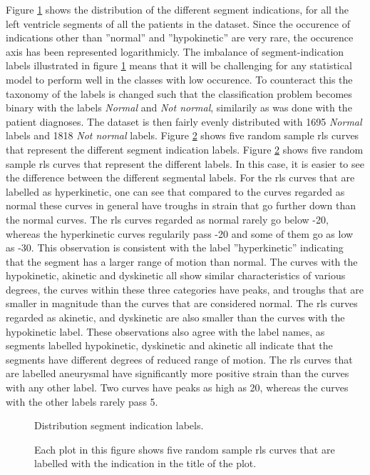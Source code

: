 Figure \ref{fig:segm_label_dist} shows the distribution of the different segment indications, for all the left ventricle segments of all the patients in the dataset. Since the occurence of indications other than ''normal'' and ''hypokinetic'' are very rare, the occurence axis has been represented logarithmicly. The imbalance of segment-indication labels illustrated in figure \ref{fig:segm_label_dist} means that it will be challenging for any statistical model to perform well in the classes with low occurence. To counteract this the taxonomy of the labels is changed such that the classification problem becomes binary with the labels \textit{Normal} and \textit{Not normal}, similarily as was done with the patient diagnoses. The dataset is then fairly evenly distributed with 1695 \textit{Normal} labels and 1818 \textit{Not normal} labels. Figure \ref{fig:rls_curves_vs_segm_labels} shows five random sample \acrshort{rls} curves that represent the different segment indication labels. Figure \ref{fig:rls_curves_vs_segm_labels} shows five random sample \acrshort{rls} curves that represent the different labels. In this case, it is easier to see the difference between the different segmental labels. For the \acrshort{rls} curves that are labelled as hyperkinetic, one can see that compared to the curves regarded as normal these curves in general have troughs in strain that go further down than the normal curves. The \acrshort{rls} curves regarded as normal rarely go below -20, whereas the hyperkinetic curves regularily pass -20 and some of them go as low as -30. This observation is consistent with the label ''hyperkinetic'' indicating that the segment has a larger range of motion than normal.  The curves with the hypokinetic, akinetic and dyskinetic all show similar characteristics of various degrees, the curves within these three categories have peaks, and troughs that are smaller in magnitude than the curves that are considered normal. The \acrshort{rls} curves regarded as akinetic, and dyskinetic are also smaller than the curves with the hypokinetic label. These observations also agree with the label names, as segments labelled hypokinetic, dyskinetic and akinetic all indicate that the segments have different degrees of reduced range of motion. The \acrshort{rls} curves that are labelled aneurysmal have significantly more positive strain than the curves with any other label. Two curves have peaks as high as 20, whereas the curves with the other labels rarely pass 5.

\begin{figure}
    \centering
    
    \caption{Distribution segment indication labels.}
    \label{fig:segm_label_dist}
\end{figure}

\begin{figure}
    \centering
    
    \caption{Each plot in this figure shows five random sample \acrshort{rls} curves that are labelled with the indication in the title of the plot.}
    \label{fig:rls_curves_vs_segm_labels}
\end{figure}